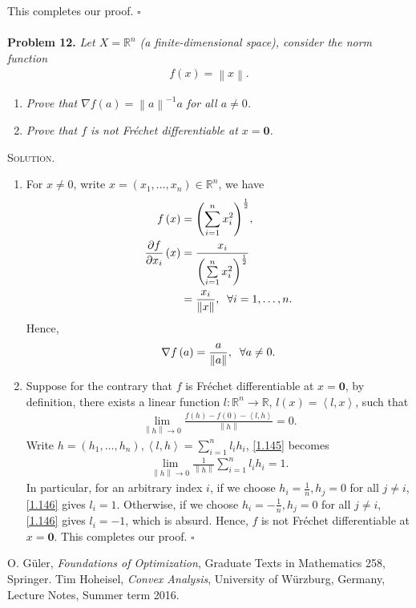\documentclass[a4paper]{article}
\numberwithin{equation}{section}
\begin{document}
This completes our proof. \hfill $\square$\\
\\
\textbf{Problem 12.} \textit{Let $X=\mathbb{R}^n$ (a finite-dimensional space), consider the norm function}
\begin{align}
f\left( x \right) = \left\| x \right\|.
\end{align}
\begin{enumerate}
\item \textit{Prove that $\nabla f\left( a \right) = {\left\| a \right\|^{ - 1}}a$ for all $a\ne 0$.}
\item \textit{Prove that $f$ is not Fr\'{e}chet differentiable at $x=\mathbf{0}$.}
\end{enumerate}
\textsc{Solution.}
\begin{enumerate}
\item For $x\ne 0$, write $x = \left( {{x_1}, \ldots ,{x_n}} \right) \in {\mathbb{R}^n}$, we have
\begin{align}
f\left( x \right) &= {\left( {\sum\limits_{i = 1}^n {x_i^2} } \right)^{\frac{1}{2}}},\\
\frac{{\partial f}}{{\partial {x_i}}}\left( x \right) &= \frac{{{x_i}}}{{{{\left( {\sum\limits_{i = 1}^n {x_i^2} } \right)}^{\frac{1}{2}}}}}  \\
&= \frac{{{x_i}}}{{\left\| x \right\|}}, \hspace{0.2cm}\forall i = 1, \ldots ,n.
\end{align}
Hence,
\begin{align}
\nabla f\left( a \right) = \frac{a}{{\left\| a \right\|}},\hspace{0.2cm}\forall a \ne 0.
\end{align}
\item Suppose for the contrary that $f$ is Fr\'{e}chet differentiable at $x=\mathbf{0}$, by definition, there exists a linear function $l:\mathbb{R}^n\to \mathbb{R}$, $l\left( x \right) = \left\langle {l,x} \right\rangle $, such that
\begin{align}
\label{1.145}
\mathop {\lim }\limits_{\left\| h \right\| \to 0} \frac{{f\left( h \right) - f\left( 0 \right) - \left\langle {l,h} \right\rangle }}{{\left\| h \right\|}} = 0.
\end{align}
Write $h = \left( {{h_1}, \ldots ,{h_n}} \right),\left\langle {l,h} \right\rangle  = \sum\limits_{i = 1}^n {{l_i}{h_i}} $, \eqref{1.145} becomes
\begin{align}
\label{1.146}
\mathop {\lim }\limits_{\left\| h \right\| \to 0} \frac{1}{{\left\| h \right\|}}\sum\limits_{i = 1}^n {{l_i}{h_i}}  = 1.
\end{align}
In particular, for an arbitrary index $i$, if we choose ${h_i} = \frac{1}{n},{h_j} = 0$ for all $j\ne i$, \eqref{1.146} gives $l_i=1$. Otherwise, if we choose ${h_i} = -\frac{1}{n},{h_j} = 0$ for all $j\ne i$, \eqref{1.146} gives $l_i=-1$, which is absurd. Hence, $f$ is not Fr\'{e}chet differentiable at $x=\mathbf{0}$. This completes our proof. \hfill $\square$
\end{enumerate}
\newpage
\begin{thebibliography}{999}
 O. G\"{u}ler, \textit{Foundations of Optimization}, Graduate Texts in Mathematics 258, Springer.
 Tim Hoheisel, \textit{Convex Analysis}, University of W\"{u}rzburg, Germany, Lecture Notes, Summer term 2016.
\end{thebibliography}
\end{document}
